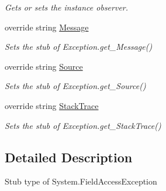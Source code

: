 \begin{DoxyCompactItemize}
\begin{DoxyCompactList}\small\item\em Gets or sets the instance observer.\end{DoxyCompactList}\item 
override string \hyperlink{class_system_1_1_fakes_1_1_stub_field_access_exception_ad4680367356e0a7168a414965f639a9f}{Message}
\begin{DoxyCompactList}\small\item\em Sets the stub of Exception.\-get\-\_\-\-Message()\end{DoxyCompactList}\item 
override string \hyperlink{class_system_1_1_fakes_1_1_stub_field_access_exception_ae813ee9977be20e0c838de477ef13f41}{Source}
\begin{DoxyCompactList}\small\item\em Sets the stub of Exception.\-get\-\_\-\-Source()\end{DoxyCompactList}\item 
override string \hyperlink{class_system_1_1_fakes_1_1_stub_field_access_exception_afcf3bd6350e2ec443cf3b67778be3a7c}{Stack\-Trace}
\begin{DoxyCompactList}\small\item\em Sets the stub of Exception.\-get\-\_\-\-Stack\-Trace()\end{DoxyCompactList}\end{DoxyCompactItemize}


\subsection{Detailed Description}
Stub type of System.\-Field\-Access\-Exception



